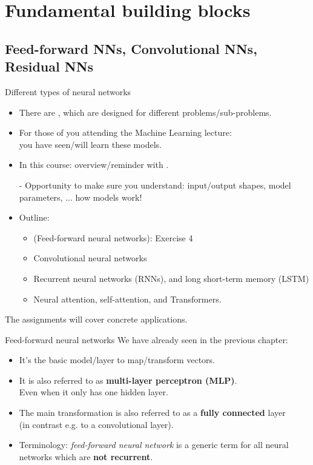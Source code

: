 \section{Fundamental building blocks}
\subsection{Feed-forward NNs, Convolutional NNs, Residual NNs}
\begin{frame}{Different types of neural networks}
\begin{itemize}
\item There are , which are designed for different problems/sub-problems.
\item For those of you attending the Machine Learning lecture:\\
you have seen/will learn these models.
\item In this course: overview/reminder with .
\item[-] Opportunity to make sure you understand: input/output shapes, model parameters, ... how models work!
\item Outline:
\begin{itemize}
\item (Feed-forward neural networks): Exercise 4
\item Convolutional neural networks
\item Recurrent neural networks (RNNs), and long short-term memory (LSTM)
\item Neural attention, self-attention, and Transformers.
\end{itemize}
\end{itemize}
The assignments will cover concrete applications.
\end{frame}

\begin{frame}{Feed-forward neural networks}
We have already seen  in the previous chapter:
\begin{itemize}
\item It's the basic model/layer to map/transform vectors.
\item It is also referred to as \textbf{multi-layer perceptron (MLP)}.\\
Even when it only has one hidden layer.
\item The main transformation is also referred to as a \textbf{fully connected} layer\\
(in contrast e.g. to a convolutional layer).
\item Terminology: \textit{feed-forward neural network} is a generic term for all neural networks which are \textbf{not recurrent}.
\end{itemize}
\end{frame}


